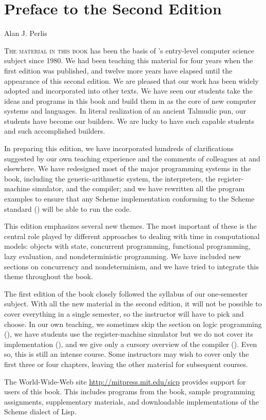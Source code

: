 \chapter*{Preface to the Second Edition}
\label{Preface}

  {Alan J. Perlis}
  {}{}

\noindent
\lettrine{T}{he material in this book} has been the basis of 's entry-level
computer science subject since 1980.  We had been teaching this material for
four years when the first edition was published, and twelve more years have
elapsed until the appearance of this second edition.  We are pleased that our
work has been widely adopted and incorporated into other texts.  We have seen
our students take the ideas and programs in this book and build them in as the
core of new computer systems and languages.  In literal realization of an
ancient Talmudic pun, our students have become our builders.  We are lucky to
have such capable students and such accomplished builders.

In preparing this edition, we have incorporated hundreds of clarifications
suggested by our own teaching experience and the comments of colleagues at
 and elsewhere.  We have redesigned most of the major programming
systems in the book, including the generic-arithmetic system, the interpreters,
the register-machine simulator, and the compiler; and we have rewritten all the
program examples to ensure that any Scheme implementation conforming to the
 Scheme standard () will be able to run the
code.

This edition emphasizes several new themes.  The most important of these is the
central role played by different approaches to dealing with time in
computational models: objects with state, concurrent programming, functional
programming, lazy evaluation, and nondeterministic programming.  We have
included new sections on concurrency and nondeterminism, and we have tried to
integrate this theme throughout the book.

The first edition of the book closely followed the syllabus of our
 one-semester subject.  With all the new material in the second
edition, it will not be possible to cover everything in a single semester, so
the instructor will have to pick and choose.  In our own teaching, we sometimes
skip the section on logic programming (), we have students use
the register-machine simulator but we do not cover its implementation (),
and we give only a cursory overview of the compiler ().
Even so, this is still an intense course.  Some instructors may
wish to cover only the first three or four chapters, leaving the other material
for subsequent courses.

The World-Wide-Web site \href{http://mitpress.mit.edu/sicp}{http://mitpress.mit.edu/sicp} provides
support for users of this book.  This includes programs from the book, sample
programming assignments, supplementary materials, and downloadable
implementations of the Scheme dialect of Lisp.

